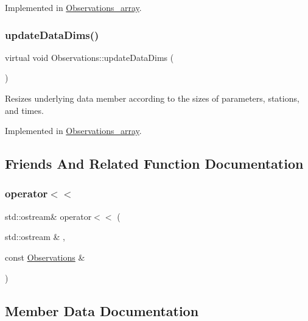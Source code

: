 Implemented in \mbox{\hyperlink{class_observations__array_ae4ed49512506eae597a158d4c87dbd31}{Observations\+\_\+array}}.

\mbox{\label{class_observations_aab0540879c2d3fdf5f91d30ea2f902fd}} 
\subsubsection{\texorpdfstring{update\+Data\+Dims()}{updateDataDims()}}
{\footnotesize\ttfamily virtual void Observations\+::update\+Data\+Dims (\begin{DoxyParamCaption}{ }\end{DoxyParamCaption})\hspace{0.3cm}{\ttfamily [pure virtual]}}

Resizes underlying data member according to the sizes of parameters, stations, and times. 

Implemented in \mbox{\hyperlink{class_observations__array_aa9364c4356d1f8a2b430c93a1fcd021f}{Observations\+\_\+array}}.



\subsection{Friends And Related Function Documentation}
\mbox{\label{class_observations_ad93ae2b52ac4bae27e3419d1545ee68f}} 
\subsubsection{\texorpdfstring{operator$<$$<$}{operator<<}}
{\footnotesize\ttfamily std\+::ostream\& operator$<$$<$ (\begin{DoxyParamCaption}\item[{std\+::ostream \&}]{,  }\item[{const \mbox{\hyperlink{class_observations}{Observations}} \&}]{ }\end{DoxyParamCaption})\hspace{0.3cm}{\ttfamily [friend]}}



\subsection{Member Data Documentation}
\mbox{\label{class_observations_a9e80eaaa9c096dda1dbbe8fcf631c087}} 
